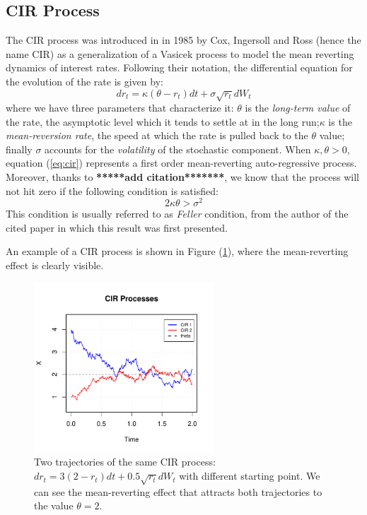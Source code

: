 \subsection{CIR Process}
The CIR process was introduced in \cite{CIR85} in 1985 by Cox, Ingersoll and Ross (hence the name CIR) as a generalization of a Vasicek process to model the mean reverting dynamics of interest rates.
Following their notation, the differential equation for the  evolution of the rate is given by:
\begin{equation}
\label{eq:cir}
	dr_t = \kappa(\theta - r_t) dt + \sigma \sqrt{r_t}dW_t
\end{equation}
where we have three parameters that characterize it: $\theta$ is the \textit{long-term value} of the rate, the asymptotic level which it tends to settle at in the long run;$\kappa$ is the \textit{mean-reversion rate}, the speed at which the rate is pulled back to the $\theta$ value; finally $\sigma$ accounts for the \textit{volatility} of the stochastic component.
When $\kappa,\theta >0$, equation (\ref{eq:cir}) represents a first order mean-reverting auto-regressive process. Moreover, thanks to \textbf{*****add citation*******}, we know that the process will not hit zero if the following condition is satisfied:
\begin{equation}
	2\kappa\theta > \sigma^2
\end{equation}
This condition is usually referred to as \textit{Feller} condition, from the author of the cited paper in which this result was first presented.

An example of a CIR process is shown in Figure (\ref{fig:cir_proc}), where the mean-reverting effect is  clearly visible.

\begin{figure}
	\centering
	\includegraphics[width=0.6\textwidth]{Images/cir_process.pdf}
	\caption{Two trajectories of the same CIR process: $dr_t = 3(2 - r_t) dt + 0.5 \sqrt{r_t}dW_t$ with different starting point. We can see the mean-reverting effect that attracts both trajectories to the value $\theta=2$. }
	\label{fig:cir_proc}
\end{figure}

